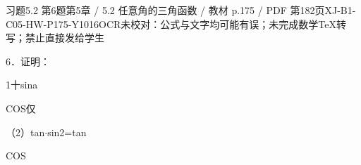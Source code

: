 \begin{bankitem}{习题5.2 第6题}{第5章 / 5.2 任意角的三角函数 / 教材 p.175 / PDF 第182页}{XJ-B1-C05-HW-P175-Y1016}{OCR未校对：公式与文字均可能有误；未完成数学TeX转写；禁止直接发给学生}
\begin{ocrdraft}
\par
6．证明：
\par
1十sina
\par
COS仅
\par
（2）tan\ensuremath{\cdot}sin2=tan
\par
COS
\end{ocrdraft}
\end{bankitem}
